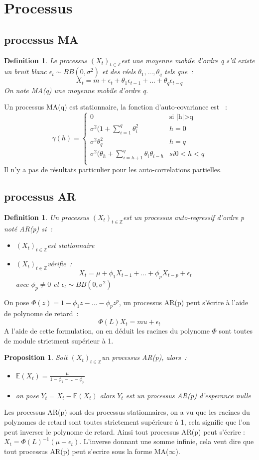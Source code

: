 \documentclass[11pt]{scrartcl} %
\newtheorem{Def}[theorem]{Definition}
\newtheorem{pro}[theorem]{Proposition}
\newcommand{\Xt}{$\left(X_t\right)_{t\in\mathbb{Z}}$}
\begin{document}
\section{Processus}
\subsection{processus MA}
\begin{Def}
Le processus \Xt est une moyenne mobile d'ordre q s'il existe un bruit blanc $\epsilon_t\sim BB(0,\sigma^2)$ et des réels $\theta_1,...,\theta_q$ tels que~:~
$$
X_t=m+\epsilon_t+\theta_1\epsilon_{t-1}+...+\theta_q\epsilon_{t-q}
$$ 
On note MA(q) une moyenne mobile d'ordre q.
\end{Def}
Un processus MA(q) est stationnaire, la fonction d'auto-covariance est ~:
$$
\gamma(h)=\left\{\begin{array}{cc}
0 & \textrm{si |h|>q}\\
\sigma^2(1+\sum_{i=1}^q\theta^2_i & h=0\\
\sigma^2 \theta^2_q & h=q\\
\sigma^2(\theta_h+\sum_{i=h+1}^q\theta_i\theta_{i-h} & si 0<h<q\\
\end{array}
\right.
$$
Il n'y a pas de résultats particulier pour les auto-correlations partielles.
\subsection{processus AR}
\begin{Def}
Un processus \Xt est un processus auto-regressif d'ordre p noté AR(p) si~:
\begin{itemize}
\item[i)] \Xt est stationnaire
\item[ii)] \Xt vérifie~:
$$
X_t = \mu + \phi_1X_{t-1}+...+\phi_pX_{t-p}+\epsilon_t
$$
avec $\phi_p\not=0$ et $\epsilon_t\sim BB(0,\sigma^2)$
\end{itemize}
\end{Def}
On pose $\Phi(z)=1-\phi_1z-...-\phi_pz^p$, un processus AR(p) peut s'écrire à l'aide de polynome de retard~:
$$
\Phi(L)X_t = mu + \epsilon_t
$$
A l'aide de cette formulation, on en déduit les racines du polynome $\Phi$ sont toutes de module strictment supérieur à 1.
\begin{pro}
Soit \Xt un processus AR(p), alors~:
\begin{itemize}
\item $\mathbb{E}\left(X_t\right) = \frac{\mu}{1-\phi_1-...-\phi_p}$\\
\item on pose $Y_t=X_t-\mathbb{E}\left(X_t\right)$ alors $Y_t$ est un processus AR(p) d'esperance nulle
\end{itemize}
\end{pro}
Les processus AR(p) sont des processus stationnaires, on a vu que les racines du polynomes de retard sont toutes strictement supérieure à 1, cela signifie que l'on peut inverser le polynome de retard. Ainsi tout processus AR(p) peut s'écrire : $X_t = \Phi(L)^{-1}\left(\mu + \epsilon_t\right)$. L'inverse donnant une somme infinie, cela veut dire que tout processus AR(p) peut s'ecrire sous la forme MA($\infty$).
\end{document}
